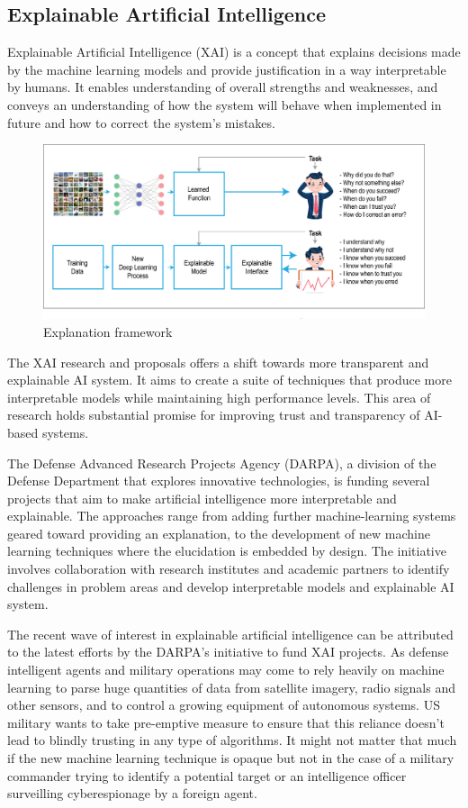 \subsection{Explainable Artificial Intelligence}
Explainable Artificial Intelligence (XAI) is a concept that explains decisions made by the machine learning models and provide justification in a way interpretable by humans. It enables understanding of overall strengths and weaknesses, and conveys an understanding of how the system will behave when implemented in future and how to correct the system’s mistakes.

\begin{figure}[htbp]
\centering
\includegraphics[width=1\textwidth]{images/XAI-concept-copy.eps}
\caption{Explanation framework}
\label{fig:Explanation framework}
\end{figure}

The XAI research and proposals offers a shift towards more transparent and explainable AI system. It aims to create a suite of techniques that produce more interpretable models while maintaining high performance levels. This area of research holds substantial promise for improving trust and transparency of AI-based systems.

The Defense Advanced Research Projects Agency (DARPA), a division of the Defense Department that explores innovative technologies, is funding several projects that aim to make artificial intelligence more interpretable and explainable. The approaches range from adding further machine-learning systems geared toward providing an explanation, to the development of new machine learning techniques where the elucidation is embedded by design. The initiative involves collaboration with research institutes and academic partners to identify challenges in problem areas and develop interpretable models and explainable AI system.

The recent wave of interest in explainable artificial intelligence can be attributed to the latest efforts by the DARPA's initiative to fund XAI projects. As defense intelligent agents and military operations may come to rely heavily on machine learning to parse huge quantities of data from satellite imagery, radio signals and other sensors, and to control a growing equipment of autonomous systems. US military wants to take pre-emptive measure to ensure that this reliance doesn’t lead to blindly trusting in any type of algorithms. It might not matter that much if the new machine learning technique is opaque but not in the case of a military commander trying to identify a potential target \cite{Knight2017} or an intelligence officer surveilling cyberespionage by a foreign agent.

